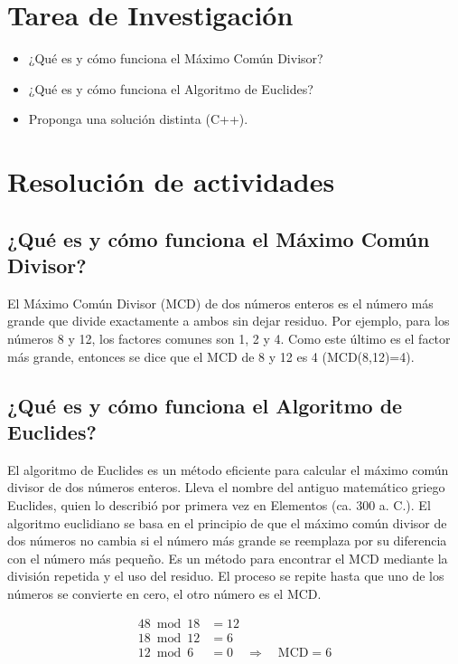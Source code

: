\documentclass{article}
\begin{document}
	\section{Tarea de Investigación}
	\begin{itemize}		
		\item ¿Qué es y cómo funciona el Máximo Común Divisor?
		\item ¿Qué es y cómo funciona el Algoritmo de Euclides?
		\item Proponga una solución distinta (C++).
	\end{itemize}
		
	\section{Resolución de actividades}
	
	\subsection{¿Qué es y cómo funciona el Máximo Común Divisor?}

    El Máximo Común Divisor (MCD) de dos números enteros es el número más grande que divide exactamente a ambos sin dejar residuo. Por ejemplo, 
    para los números 8 y 12, los factores comunes son 1, 2 y 4. Como este último es el factor más grande, entonces se dice que el
    MCD de 8 y 12 es 4 (MCD(8,12)=4).


	\subsection{¿Qué es y cómo funciona el Algoritmo de Euclides?}

    El algoritmo de Euclides es un método eficiente para calcular el máximo común divisor de dos números enteros. Lleva el nombre del antiguo matemático griego Euclides, quien lo describió por primera vez en Elementos (ca. 300 a. C.). El algoritmo euclidiano se basa en el principio de que el máximo común divisor de dos números no cambia si el número más grande se reemplaza por su diferencia con el número más pequeño. Es un método para encontrar el MCD mediante la división repetida y el uso del residuo. El proceso se repite hasta que uno de los números se convierte en cero, el otro número es el MCD.
		
    \begin{align*}
    48 \bmod 18 &= 12 \\
    18 \bmod 12 &= 6 \\
    12 \bmod 6 &= 0 \quad \Rightarrow \quad \text{MCD} = 6
    \end{align*}
	
\end{document}
